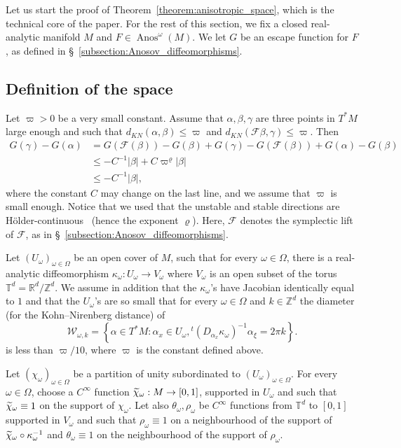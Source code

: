 \documentclass[10pt]{amsart}
\theoremstyle{definition}\newtheorem{defi}[theo]{Definition}\newtheorem{rema}[theo]{Remark}\newtheorem{exam}[theo]{Example}\newtheorem{exem}[theo]{Example}\newtheorem{nota}[theo]{Notation}
\DeclareMathOperator{\Anos}{Anos}
\newcommand{\set}[1]{\left\{ #1 \right\}}
\newcommand{\va}[1]{\left|#1\right|}
\newcommand{\clF}{\mathcal{F}}
\newcommand{\clW}{\mathcal{W}}
\newcommand{\bbZ}{\mathbb{Z}}
\newcommand{\bbT}{\mathbb{T}}
\newcommand{\bbR}{\mathbb{R}}
\let\oldtilde\tilde
\renewcommand*{\tilde}[1]{\mathchoice{\widetilde{#1}}{\widetilde{#1}}{\oldtilde{#1}}{\oldtilde{#1}}}
\begin{document}
Let us start the proof of Theorem~\ref{theorem:anisotropic_space}, which is the technical core of the paper. For the rest of this section, we fix a closed real-analytic manifold $M$ and $F \in \Anos^\omega(M)$. We let $G$ be an escape function for $F$, as defined in \S~\ref{subsection:Anosov_diffeomorphisms}.

\subsection{Definition of the space}

Let $\varpi > 0$ be a very small constant. Assume that $\alpha,\beta,\gamma$ are three points in $T^* M$ large enough and such that $d_{KN}(\alpha,\beta) \leq \varpi$ and $d_{KN}(\clF \beta,\gamma) \leq \varpi$. Then
\begin{equation}\label{eq:approximate_decay}
\begin{split}
G(\gamma) - G(\alpha) & = G(\clF(\beta)) - G(\beta) + G(\gamma) - G(\clF(\beta)) + G(\alpha) - G(\beta) \\
& \leq - C^{-1} \va{\beta} + C \varpi^\varrho \va{\beta} \\
& \leq - C^{-1} \va{\beta},
\end{split}
\end{equation}
where the constant $C$ may change on the last line, and we assume that $\varpi$ is small enough. Notice that we used that the unstable and stable directions are Hölder-continuous~\cite[Theorem~6.3]{hirsch_pugh} (hence the exponent $\varrho$). Here, $\clF$ denotes the symplectic lift of $\clF$, as in \S~\ref{subsection:Anosov_diffeomorphisms}.

Let $(U_\omega)_{\omega \in \Omega}$ be an open cover of $M$, such that for every $\omega \in \Omega$, there is a real-analytic diffeomorphism $\kappa_\omega : U_\omega \to V_\omega$ where $V_\omega$ is an open subset of the torus $\bbT^d = \bbR^d / \bbZ^d$. We assume in addition that the $\kappa_\omega$'s have Jacobian identically equal to $1$ and that the $U_\omega$'s are so small that for every $\omega \in \Omega$ and $k \in \bbZ^d$ the diameter (for the Kohn--Nirenberg distance) of
\begin{equation*}
\clW_{\omega,k} = \set{\alpha \in T^* M : \alpha_x \in U_\omega, {}^t (D_{\alpha_x} \kappa_\omega)^{-1} \alpha_\xi = 2 \pi k}.
\end{equation*}
is less than $\varpi / 10$, where $\varpi$ is the constant defined above.

Let $(\chi_\omega)_{\omega \in \Omega}$ be a partition of unity subordinated to $(U_\omega)_{\omega \in \Omega}$. For every $\omega \in \Omega$, choose a $C^\infty$ function $\tilde{\chi}_\omega : M \to [0,1]$, supported in $U_\omega$ and such that $\tilde{\chi}_\omega \equiv 1$ on the support of $\chi_\omega$. Let also $\theta_\omega,\rho_\omega$ be $C^\infty$ functions from $\bbT^d$ to $[0,1]$ supported in $V_\omega$ and such that $\rho_\omega \equiv 1$ on a neighbourhood of the support of $\tilde{\chi}_\omega \circ \kappa_\omega^{-1}$ and $\theta_\omega \equiv 1$ on the neighbourhood of the support of $\rho_\omega$.
\end{document}
